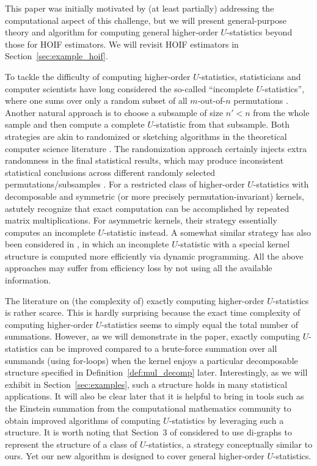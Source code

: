 \documentclass[letterpaper,11pt]{article}
\begin{document}
\begin{bibunit}[plainnat]
This paper was initially motivated by (at least partially) addressing the computational aspect of this challenge, but we will present general-purpose theory and algorithm for computing general higher-order $U$-statistics beyond those for HOIF estimators. We will revisit HOIF estimators in Section~\ref{sec:example_hoif}. 

To tackle the difficulty of computing higher-order $U$-statistics, statisticians and computer scientists have long considered the so-called ``incomplete $U$-statistics'', where one sums over only a random subset of all $m$-out-of-$n$ permutations \citep{blom1976some, janson1984asymptotic, nowicki1988subgraph, shao2025u}. Another natural approach is to choose a subsample of size $n' < n$ from the whole sample and then compute a complete $U$-statistic from that subsample. Both strategies are akin to randomized or sketching algorithms in the theoretical computer science literature \citep{mahoney2011randomized}. The randomization approach certainly injects extra randomness in the final statistical results, which may produce inconsistent statistical conclusions across different randomly selected permutations/subsamples \citep{guo2025rank}. For a restricted class of higher-order $U$-statistics with decomposable and symmetric (or more precisely permutation-invariant) kernels, \citet{kong2018estimating} astutely recognize that exact computation can be accomplished by repeated matrix multiplications. For asymmetric kernels, their strategy essentially computes an incomplete $U$-statistic instead. A somewhat similar strategy has also been considered in \citet{zhang2025adaptive}, in which an incomplete $U$-statistic with a special kernel structure is computed more efficiently via dynamic programming. All the above approaches may suffer from efficiency loss by not using all the available information.

The literature on (the complexity of) exactly computing higher-order $U$-statistics is rather scarce. This is hardly surprising because the exact time complexity of computing higher-order $U$-statistics seems to simply equal the total number of summations. However, as we will demonstrate in the paper, exactly computing $U$-statistics can be improved compared to a brute-force summation over all summands (using for-loops) when the kernel enjoys a particular decomposable structure specified in Definition~\ref{def:mul_decomp} later. Interestingly, as we will exhibit in Section~\ref{sec:examples}, such a structure holds in many statistical applications. It will also be clear later that it is helpful to bring in tools such as the Einstein summation from the computational mathematics community to obtain improved algorithms of computing $U$-statistics by leveraging such a structure. It is worth noting that Section~3 of \citet{liu2024hypothesis} considered to use di-graphs to represent the structure of a class of $U$-statistics, a strategy conceptually similar to ours. Yet our new algorithm is designed to cover general higher-order $U$-statistics.


\end{bibunit}
\end{document}
